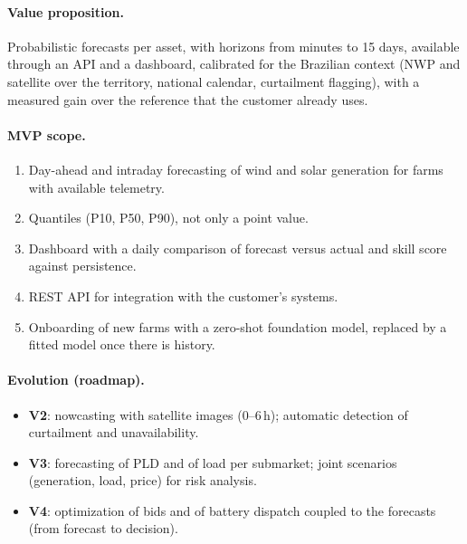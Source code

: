 \documentclass[10pt,a4paper,oneside]{article}
\begin{document}
\paragraph{Value proposition.}
Probabilistic forecasts per asset, with horizons from minutes to 15 days,
available through an API and a dashboard, calibrated for the Brazilian
context (NWP and satellite over the territory, national calendar, curtailment
flagging), with a measured gain over the reference that the customer already
uses.

\paragraph{MVP scope.}
\begin{enumerate}
  \item Day-ahead and intraday forecasting of wind and solar generation for
    farms with available telemetry.
  \item Quantiles (P10, P50, P90), not only a point value.
  \item Dashboard with a daily comparison of forecast versus actual and
    skill score against persistence.
  \item REST API for integration with the customer's systems.
  \item Onboarding of new farms with a zero-shot foundation model, replaced
    by a fitted model once there is history.
\end{enumerate}

\paragraph{Evolution (roadmap).}
\begin{itemize}
  \item \textbf{V2}: nowcasting with satellite images (0--6\,h); automatic
    detection of curtailment and unavailability.
  \item \textbf{V3}: forecasting of PLD and of load per submarket; joint
    scenarios (generation, load, price) for risk analysis.
  \item \textbf{V4}: optimization of bids and of battery dispatch coupled to
    the forecasts (from forecast to decision).
\end{itemize}
\end{document}
